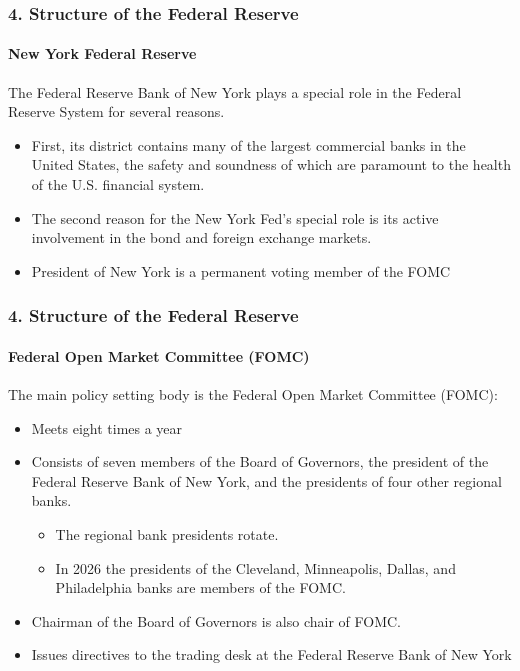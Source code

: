 \documentclass{beamer}
\begin{document}
\begin{frame}[t]
    \frametitle{4. Structure of the Federal Reserve}
    \framesubtitle{New York Federal Reserve}

    The Federal Reserve Bank of New York plays a special role in the Federal Reserve System for several reasons.

    \begin{itemize}
        \item First, its district contains many of the largest commercial banks in the United States, the safety and soundness of which are paramount to the health of the U.S. financial system.
        \item The second reason for the New York Fed’s special role is its active involvement in the bond and foreign exchange markets.
        \item President of New York is a permanent voting member of the FOMC
    \end{itemize}

\end{frame}

\begin{frame}[t]
    \frametitle{4. Structure of the Federal Reserve}
    \framesubtitle{Federal Open Market Committee (FOMC)}

The main policy setting body is the Federal Open Market Committee (FOMC):
\begin{itemize}
    \item Meets eight times a year
    \item Consists of seven members of the Board of Governors, the president of the Federal Reserve Bank of New York, and the presidents of four other regional banks.
    \begin{itemize}
        \item The regional bank presidents rotate.
        \item In 2026 the presidents of the Cleveland, Minneapolis, Dallas, and Philadelphia banks are members of the FOMC.
    \end{itemize}
    \item Chairman of the Board of Governors is also chair of FOMC.
    \item Issues directives to the trading desk at the Federal Reserve Bank of New York
\end{itemize}

\end{frame}
\end{document}
